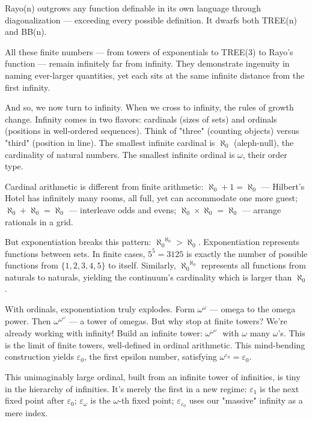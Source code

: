 Rayo(n) outgrows any function definable in its own language through diagonalization — exceeding every possible definition. It dwarfs both TREE(n) and BB(n).

All these finite numbers — from towers of exponentials to TREE(3) to Rayo's function — remain infinitely far from infinity. They demonstrate ingenuity in naming ever-larger quantities, yet each sits at the same infinite distance from the first infinity.

And so, we now turn to infinity. When we cross to infinity, the rules of growth change. Infinity comes in two flavors: cardinals (sizes of sets) and ordinals (positions in well-ordered sequences). Think of "three" (counting objects) versus "third" (position in line). The smallest infinite cardinal is $\aleph_0$ (aleph-null), the cardinality of natural numbers. The smallest infinite ordinal is $\omega$, their order type.

Cardinal arithmetic is different from finite arithmetic: $\aleph_0 + 1 = \aleph_0$ — Hilbert's Hotel has infinitely many rooms, all full, yet can accommodate one more guest; $\aleph_0 + \aleph_0 = \aleph_0$ — interleave odds and evens; $\aleph_0 \times \aleph_0 = \aleph_0$ — arrange rationals in a grid.

But exponentiation breaks this pattern: ${\aleph_0}^{\aleph_0} > \aleph_0$. Exponentiation represents functions between sets. In finite cases, $5^5 = 3125$ is exactly the number of possible functions from $\{1,2,3,4,5\}$ to itself. Similarly, ${\aleph_0}^{\aleph_0}$ represents all functions from naturals to naturals, yielding the continuum's cardinality which is larger than $\aleph_0$. 

With ordinals, exponentiation truly explodes. Form $\omega^\omega$ — omega to the omega power. Then $\omega^{\omega^\omega}$ — a tower of omegas. But why stop at finite towers? We're already working with infinity! Build an infinite tower: $\omega^{\omega^{\omega^{\cdot^{\cdot^{\cdot}}}}}$ with $\omega$ many $\omega$'s. This is the limit of finite towers, well-defined in ordinal arithmetic. This mind-bending construction yields $\varepsilon_0$, the first epsilon number, satisfying $\omega^{\varepsilon_0} = \varepsilon_0$.

This unimaginably large ordinal, built from an infinite tower of infinities, is tiny in the hierarchy of infinities. It's merely the first in a new regime:
$\varepsilon_1$ is the next fixed point after $\varepsilon_0$; $\varepsilon_\omega$ is the $\omega$-th fixed point; $\varepsilon_{\varepsilon_0}$ uses our "massive" infinity as a mere index.

